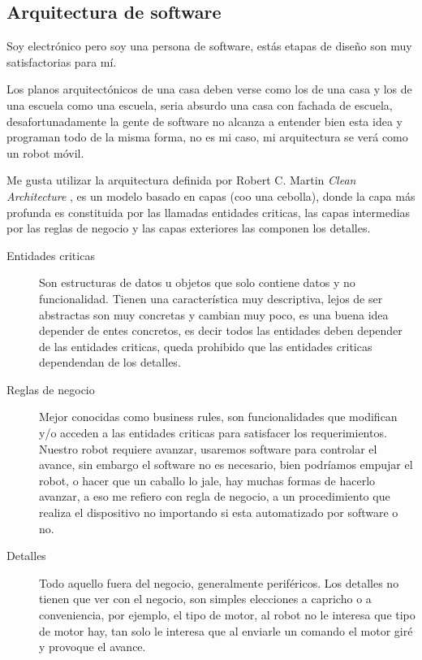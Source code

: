 \subsection{Arquitectura de software}
Soy electrónico pero soy una persona de software, estás etapas de diseño son muy
satisfactorias para mí.

Los planos arquitectónicos de una casa deben verse como
los de una casa y los de una escuela como una escuela, seria absurdo una casa con
fachada de escuela, desafortunadamente la gente de software no alcanza a entender
bien esta idea y programan todo de la misma forma, no es mi caso, mi arquitectura
se verá como un robot móvil.

Me gusta utilizar la arquitectura definida por Robert C. Martin \emph{Clean 
Architecture} \cite{clean_architecture}, es un modelo basado en 
capas (coo una cebolla), donde la capa más 
profunda es constituida por las llamadas entidades criticas, las capas intermedias
por las reglas de negocio y las capas exteriores las componen los detalles.
\begin{description}
	\item[Entidades criticas] Son estructuras de datos u objetos que solo 
		contiene datos y no funcionalidad. Tienen una característica muy
		descriptiva, lejos de ser abstractas son muy concretas y cambian
		muy poco, es una buena idea depender de entes concretos, es decir
		todos las entidades deben depender de las entidades criticas, queda
		prohibido que las entidades criticas dependendan de los detalles. 
	\item[Reglas de negocio] Mejor conocidas como business rules, son 
		funcionalidades que modifican y/o acceden a las entidades criticas
		para satisfacer los requerimientos. Nuestro robot requiere avanzar,
		usaremos software para controlar el avance, sin embargo el software
		no es necesario, bien podríamos empujar el robot, o hacer que un
		caballo lo jale, hay muchas formas de hacerlo avanzar, a eso me 
		refiero con regla de negocio, a un procedimiento que realiza el 
		dispositivo no importando si esta automatizado por software o no.
	\item[Detalles] Todo aquello fuera del negocio, generalmente periféricos.
		Los detalles no tienen que ver con el negocio, son simples 
		elecciones a capricho o a conveniencia, por ejemplo, el tipo de 
		motor, al robot no le interesa que tipo de motor hay, tan solo
		le interesa que al enviarle un comando el motor giré y provoque el
		avance. 
\end{description}

